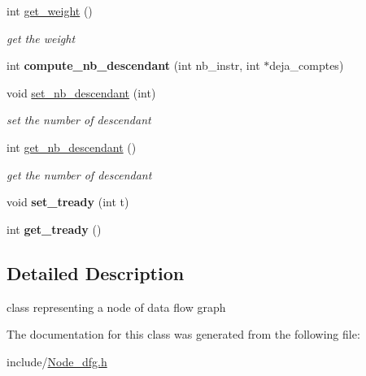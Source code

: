 \begin{DoxyCompactItemize}
int \mbox{\hyperlink{class_node__dfg_a561e80f51cb9a71b22f22e8d2e6685de}{get\+\_\+weight}} ()
\begin{DoxyCompactList}\small\item\em get the weight \end{DoxyCompactList}\item 
\mbox{\label{class_node__dfg_a613aa3ee9ce2eb99df07258cbdd5293f}} 
int {\bfseries compute\+\_\+nb\+\_\+descendant} (int nb\+\_\+instr, int $\ast$deja\+\_\+comptes)
\item 
\mbox{\label{class_node__dfg_a9aa775f727e6c542cd714894219046f3}} 
void \mbox{\hyperlink{class_node__dfg_a9aa775f727e6c542cd714894219046f3}{set\+\_\+nb\+\_\+descendant}} (int)
\begin{DoxyCompactList}\small\item\em set the number of descendant \end{DoxyCompactList}\item 
\mbox{\label{class_node__dfg_a9baa0a6be056b7d1ee290c404f2216f5}} 
int \mbox{\hyperlink{class_node__dfg_a9baa0a6be056b7d1ee290c404f2216f5}{get\+\_\+nb\+\_\+descendant}} ()
\begin{DoxyCompactList}\small\item\em get the number of descendant \end{DoxyCompactList}\item 
\mbox{\label{class_node__dfg_ad9fe88cf90fa2282806edbc64f51331e}} 
void {\bfseries set\+\_\+tready} (int t)
\item 
\mbox{\label{class_node__dfg_a05e8db316dd2db8b0946167763585c7b}} 
int {\bfseries get\+\_\+tready} ()
\end{DoxyCompactItemize}


\subsection{Detailed Description}
class representing a node of data flow graph 

The documentation for this class was generated from the following file\+:\begin{DoxyCompactItemize}
\item 
include/\mbox{\hyperlink{_node__dfg_8h}{Node\+\_\+dfg.\+h}}\end{DoxyCompactItemize}
